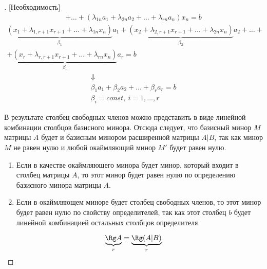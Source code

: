 \begin{proof}[][Необходимость]
\begin{multline*}
		+ \ldots + (\lambda_{1n}a_1 + \lambda_{2n}a_2 + \ldots + \lambda_{rn}a_n)x_n = b
	\end{multline*} \vspace{-3\topsep}
	\begin{multline*}
		\underbrace{(x_1 + \lambda_{1,r+1}x_{r+1} + \ldots + \lambda_{1n}x_n)}_{\beta_1}a_1 + \underbrace{(x_2 + \lambda_{2,r+1}x_{r+1} + \ldots + \lambda_{2n}x_n)}_{\beta_2}a_2 + \ldots + \\
		+ \underbrace{(x_r + \lambda_{r,r+1}x_{r+1} + \ldots + \lambda_{rn}x_n)}_{\beta_r}a_r = b
	\end{multline*} \vspace{-2.5\topsep}
	\begin{gather*}
		\Downarrow\\
		\beta_1a_1 + \beta_2a_2 + \ldots + \beta_ra_r = b\\
		\beta_i = const,\ i=1, \ldots, r
	\end{gather*} \par
	В результате столбец свободных членов можно представить в виде линейной комбинации столбцов базисного минора. Отсюда следует, что базисный минор $M$ матрицы $A$ будет и базисным минором расширенной матрицы $A|B$, так как минор $M$ не равен нулю и любой окаймляющий минор $M'$ будет равен нулю.
	\begin{enumerate}
		\item Если в качестве окаймляющего минора будет минор, который входит в столбец матрицы $A$, то этот минор будет равен нулю по определению базисного минора матрицы $A$. 
		\item Если в окаймляющем миноре будет столбец свободных членов, то этот минор будет равен нулю по свойству определителей, так как этот столбец $b$ будет линейной комбинацией остальных столбцов определителя.
	\end{enumerate}
	\[ \underbrace{\Rg A}_{r} = \underbrace{\Rg (A|B)}_{r} \]
\end{proof}
